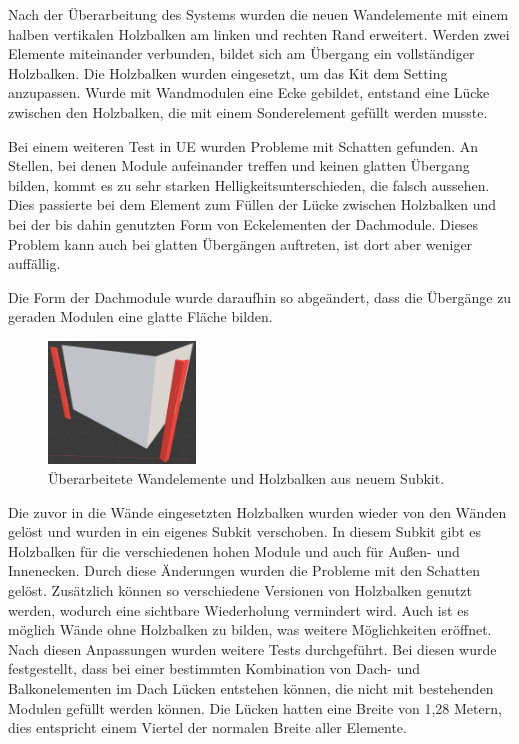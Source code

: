 Nach der Überarbeitung des Systems wurden die neuen Wandelemente mit einem halben vertikalen Holzbalken am linken und rechten Rand erweitert. Werden zwei Elemente miteinander verbunden, bildet sich am Übergang ein vollständiger Holzbalken. Die Holzbalken wurden eingesetzt, um das Kit dem Setting anzupassen. Wurde mit Wandmodulen eine Ecke gebildet, entstand eine Lücke zwischen den Holzbalken, die mit einem Sonderelement gefüllt werden musste.
\par
Bei einem weiteren Test in UE wurden Probleme mit Schatten gefunden. An Stellen, bei denen Module aufeinander treffen und keinen glatten Übergang bilden, kommt es zu sehr starken Helligkeitsunterschieden, die falsch aussehen. Dies passierte bei dem Element zum Füllen der Lücke zwischen Holzbalken und bei der bis dahin genutzten Form von Eckelementen der Dachmodule. Dieses Problem kann auch bei glatten Übergängen auftreten, ist dort aber weniger auffällig.
\par
Die Form der Dachmodule wurde daraufhin so abgeändert, dass die Übergänge zu geraden Modulen eine glatte Fläche bilden.
\par
\begin{figure}
  \centering 
   \vspace{-11.5pt}
    \includegraphics[width=0.35\textwidth]{bilder/holzecke2}
      \caption{Überarbeitete Wandelemente und Holzbalken aus neuem Subkit.}\label{holzecke2}
          \vspace{-14pt}
\end{figure}
Die zuvor in die Wände eingesetzten Holzbalken wurden wieder von den Wänden gelöst und wurden in ein eigenes Subkit verschoben. In diesem Subkit gibt es Holzbalken für die verschiedenen hohen Module und auch für Außen- und Innenecken. Durch diese Änderungen wurden die Probleme mit den Schatten gelöst. Zusätzlich können so verschiedene Versionen von Holzbalken genutzt werden, wodurch eine sichtbare Wiederholung vermindert wird. Auch ist es möglich Wände ohne Holzbalken zu bilden, was weitere Möglichkeiten eröffnet.
\newpage
Nach diesen Anpassungen wurden weitere Tests durchgeführt. Bei diesen wurde festgestellt, dass bei einer bestimmten Kombination von Dach- und Balkonelementen im Dach Lücken entstehen können, die nicht mit bestehenden Modulen gefüllt werden können. Die Lücken hatten eine Breite von 1,28 Metern, dies entspricht einem Viertel der normalen Breite aller Elemente.
